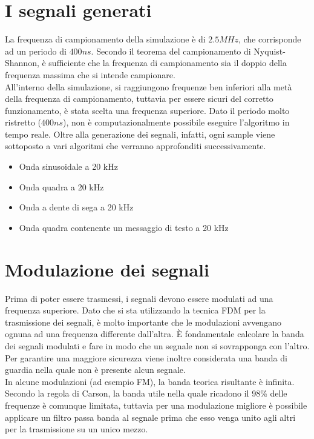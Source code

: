 \documentclass{article}
\begin{document}
\section{I segnali generati}
La frequenza di campionamento della simulazione è di $2.5 MHz$, che corrisponde ad un periodo di $400 ns$. Secondo il teorema
del campionamento di Nyquist-Shannon, è sufficiente che la frequenza di campionamento sia il doppio della frequenza massima
che si intende campionare.\\
All'interno della simulazione, si raggiungono frequenze ben inferiori alla metà della frequenza di campionamento, tuttavia
per essere sicuri del corretto funzionamento, è stata scelta una frequenza superiore. Dato il periodo molto ristretto ($400 ns$),
non è computazionalmente possibile eseguire l'algoritmo in tempo reale. Oltre alla generazione dei segnali, infatti, ogni
sample viene sottoposto a vari algoritmi che verranno approfonditi successivamente.

\begin{itemize}
    \item Onda sinusoidale a 20 kHz
    \item Onda quadra a 20 kHz
    \item Onda a dente di sega a 20 kHz
    \item Onda quadra contenente un messaggio di testo a 20 kHz
\end{itemize}

\section{Modulazione dei segnali}
Prima di poter essere trasmessi, i segnali devono essere modulati ad una frequenza superiore. Dato che si sta utilizzando la
tecnica FDM per la trasmissione dei segnali, è molto importante che le modulazioni avvengano ognuna ad una frequenza differente
dall'altra. È fondamentale calcolare la banda dei segnali modulati e fare in modo che un segnale non si sovrapponga con l'altro.
Per garantire una maggiore sicurezza viene inoltre considerata una banda di guardia nella quale non è presente alcun segnale.\\
In alcune modulazioni (ad esempio FM), la banda teorica risultante è infinita. Secondo la regola di Carson, la banda utile nella
quale ricadono il 98\% delle frequenze è comunque limitata, tuttavia per una modulazione migliore è possibile applicare un filtro
passa banda al segnale prima che esso venga unito agli altri per la trasmissione su un unico mezzo.\\
\end{document}
